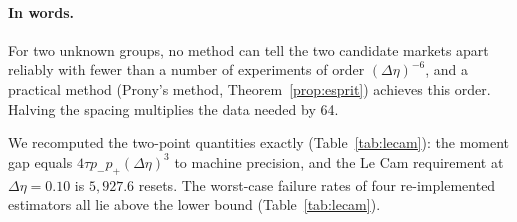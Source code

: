 \documentclass[12pt]{article}
\theoremstyle{definition}
\theoremstyle{remark}
\begin{document}
\paragraph{In words.} For two unknown groups, no method can tell the two candidate markets apart reliably with fewer than a number of experiments of order $(\Delta\eta)^{-6}$, and a practical method (Prony's method, Theorem~\ref{prop:esprit}) achieves this order. Halving the spacing multiplies the data needed by 64.

We recomputed the two-point quantities exactly (Table~\ref{tab:lecam}): the moment gap equals $4\tau p_-p_+(\Delta\eta)^3$ to machine precision, and the Le Cam requirement at $\Delta\eta=0.10$ is $5{,}927.6$ resets. The worst-case failure rates of four re-implemented estimators all lie above the lower bound (Table~\ref{tab:lecam}).
\end{document}
